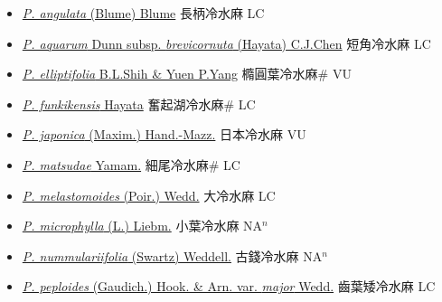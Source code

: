 \begin{itemize}
  \begin{itemize}
        \item[] \href{http://www.theplantlist.org/tpl1.1/search?q=Pilea+angulata}{\textit{P. angulata} (Blume) Blume}   長柄冷水麻 LC
        \item[] \href{http://www.theplantlist.org/tpl1.1/search?q=Pilea+aquarum+subsp.+brevicornuta}{\textit{P. aquarum} Dunn subsp. \textit{brevicornuta} (Hayata) C.J.Chen}   短角冷水麻 LC
        \item[] \href{http://www.theplantlist.org/tpl1.1/search?q=Pilea+elliptifolia}{\textit{P. elliptifolia} B.L.Shih \& Yuen P.Yang}   橢圓葉冷水麻\# VU
        \item[] \href{http://www.theplantlist.org/tpl1.1/search?q=Pilea+funkikensis}{\textit{P. funkikensis} Hayata}   奮起湖冷水麻\# LC
        \item[] \href{http://www.theplantlist.org/tpl1.1/search?q=Pilea+japonica}{\textit{P. japonica} (Maxim.) Hand.-Mazz.}   日本冷水麻 VU
        \item[] \href{http://www.theplantlist.org/tpl1.1/search?q=Pilea+matsudae}{\textit{P. matsudae} Yamam.}   細尾冷水麻\# LC
        \item[] \href{http://www.theplantlist.org/tpl1.1/search?q=Pilea+melastomoides}{\textit{P. melastomoides} (Poir.) Wedd.}   大冷水麻 LC
        \item[] \href{http://www.theplantlist.org/tpl1.1/search?q=Pilea+microphylla}{\textit{P. microphylla} (L.) Liebm.}   小葉冷水麻 NA$^n$
        \item[] \href{http://www.theplantlist.org/tpl1.1/search?q=Pilea+nummulariifolia}{\textit{P. nummulariifolia} (Swartz) Weddell.}   古錢冷水麻 NA$^n$
        \item[] \href{http://www.theplantlist.org/tpl1.1/search?q=Pilea+peploides+var.+major}{\textit{P. peploides} (Gaudich.) Hook. \& Arn. var. \textit{major} Wedd.}   齒葉矮冷水麻 LC

\end{itemize}
\end{itemize}
